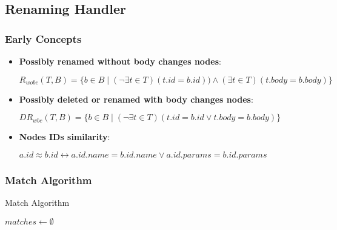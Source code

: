 \documentclass[../../Algorithms.tex]{subfiles}
\begin{document}
    \subsection{Renaming Handler}
    \subsubsection{Early Concepts}

    \begin{itemize}
        \item \textbf{Possibly renamed without body changes nodes}:

        $R_{wobc}(T, B) = \{ b \in B \mid (\lnot \exists t \in T) (t.id = b.id)) \land (\exists t \in T) (t.body = b.body)\}$

        \item \textbf{Possibly deleted or renamed with body changes nodes}:
        
        $DR_{wbc}(T, B) = \{ b \in B \mid (\lnot \exists t \in T) (t.id = b.id \lor t.body = b.body)\}$

        \item \textbf{Nodes IDs similarity}:
        
        $a.id \approx b.id \leftrightarrow a.id.name = b.id.name \lor a.id.params = b.id.params$
    \end{itemize}

    \subsubsection{Match Algorithm}
    
    \begin{algorithm}[H]
        \caption{Match Algorithm}
        \SetAlgoLined

        
        \BlankLine
        
        $matches \leftarrow \emptyset$\;

        \BlankLine
    \end{algorithm}
\end{document}
